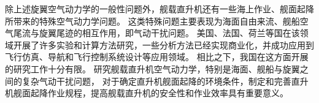 除上述旋翼空气动力学的一般性问题外，舰载直升机还有一些海上作业、舰面起降所带来的特殊空气动力学问题。
这类特殊问题主要表现为海面自由来流、舰船空气尾流与旋翼尾迹的相互作用，即气动干扰问题。
美国、法国、荷兰等国在该领域开展了许多实验和计算方法研究，一些分析方法已经实现商业化，并成功应用到飞行仿真、导航和飞行控制系统设计等应用领域。
相比之下，我国在这方面开展的研究工作十分有限。
研究舰载直升机空气动力学，特别是海面、舰船与旋翼之间的复杂气动干扰问题，
对于确定直升机舰面起降的环境条件，制定和完善直升机舰面起降作业规程，提高舰载直升机的安全性和作业效率具有重要意义。

